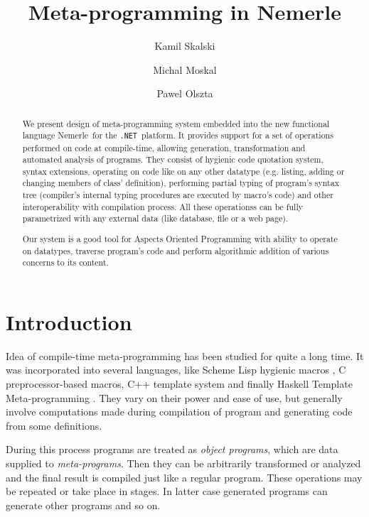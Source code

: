 \documentclass{llncs}
\newcommand{\net}[0]{{\tt .NET}}
\newcommand{\nem}[0]{Nemerle}
\begin{document}
%
\frontmatter          %
%
\pagestyle{headings}  %
%
\title{Meta-programming in \nem}
%
%
\author{Kamil Skalski \and Michal Moskal \and Pawel Olszta}
%
%
%
%
\maketitle              %
%
\begin{abstract}
We present design of meta-programming system embedded into the new functional
language \nem\ for the \net\ platform. It provides support for a set of 
operations performed on code at compile-time, allowing generation,
transformation and automated analysis of programs. They consist of
hygienic code quotation system, syntax extensions, operating on code like 
on any other datatype (e.g. listing, adding or changing members of class'
definition), performing partial typing of program's syntax tree
(compiler's internal typing procedures are executed by macro's code)
and other interoperability with compilation process. All these operationss can 
be fully parametrized with any external data (like database, file or 
a web page).

Our system is a good tool for Aspects Oriented Programming with ability
to operate on datatypes, traverse program's code and perform algorithmic 
addition of various concerns to its content.
\end{abstract}

\section{Introduction}
Idea of compile-time meta-programming has been studied for quite a long time.
It was incorporated into several languages, like Scheme Lisp hygienic macros 
\cite{Lisp:Scheme}, C preprocessor-based macros, C++ template system and finally 
Haskell Template Meta-programming \cite{Haskell:Meta}. 
They vary on their power and ease of use, but generally involve computations 
made during compilation of program and generating code from some definitions.

During this process programs are treated as \emph{object programs}, which are 
data supplied to \emph{meta-programs}. Then they can be arbitrarily transformed or 
analyzed and the final result is compiled just like a regular program. These operations 
may be repeated or take place in stages. In latter case generated programs can 
generate other programs and so on.
\end{document}
